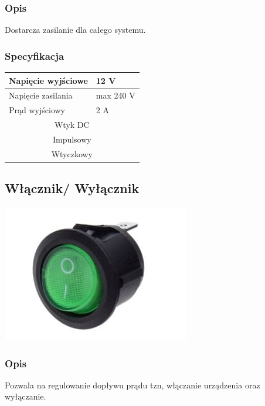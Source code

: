 \documentclass[12pt]{article}
\begin{document}
\subsubsection{Opis}
Dostarcza zasilanie dla całego systemu.
\subsubsection{Specyfikacja}
\begin{center}
\begin{tabular}{ | m{5cm} | m{3cm} | } 
\hline
Napięcie wyjściowe &  12 V\\ 
\hline
Napięcie zasilania & max 240 V\\ 
\hline
Prąd wyjściowy& 2 A\\
\hline 
\multicolumn{2}{|c|}{Wtyk DC}\\
\hline 
\multicolumn{2}{|c|}{Impulsowy}\\
\hline  
\multicolumn{2}{|c|}{Wtyczkowy}\\ 
\hline
\end{tabular}
\end{center}
\subsection{Włącznik/ Wyłącznik}
\begin{center}
\begin{minipage}[H]{.85\textwidth}
    \includegraphics[width=1.0\linewidth]{switcher.png}
\end{minipage}
\end{center}
\subsubsection{Opis}
Pozwala na regulowanie dopływu prądu tzn, włączanie urządzenia oraz wyłączanie.
\end{document}
